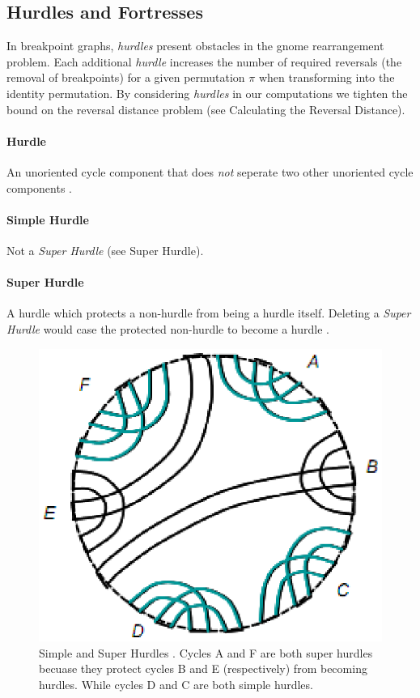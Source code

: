 \documentclass[10pt]{article}
\begin{document}
\subsection*{Hurdles and Fortresses}
In breakpoint graphs, \emph{hurdles} present obstacles in the gnome
rearrangement problem. Each additional \emph{hurdle} increases the number of
required reversals (the removal of breakpoints) for a given permutation $\pi$
when transforming into the identity permutation. By considering \emph{hurdles}
in our computations we tighten the bound on the reversal distance problem (see
Calculating the Reversal Distance).

\paragraph{Hurdle} An unoriented cycle component that does \emph{not} seperate
two other unoriented cycle components \cite{1375Algo}.

\paragraph{Simple Hurdle} Not a \emph{Super Hurdle} (see Super Hurdle).

\paragraph{Super Hurdle} A hurdle which protects a non-hurdle from being a
hurdle itself. Deleting a \emph{Super Hurdle} would case the protected
non-hurdle to become a hurdle \cite{Hannenhalli95transformingcabbage}.

\begin{figure}[here!]
\includegraphics[scale=0.5]{resources/hurdles.eps}
\caption{Simple and Super Hurdles \cite{Hurdles}. Cycles A and F are both super
hurdles becuase they protect cycles B and E (respectively) from becoming
hurdles. While cycles D and C are both simple hurdles.}
\label{fig:hurdles}
\end{figure}
\end{document}
